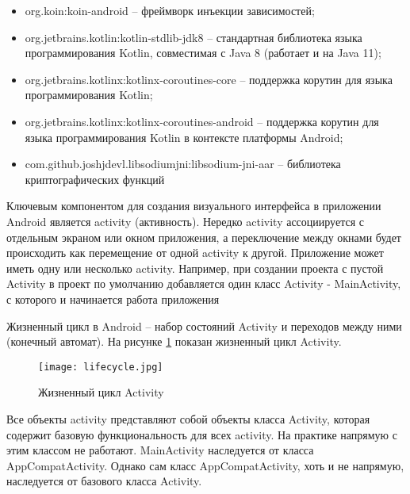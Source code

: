 \begin{itemize}
    \item org.koin:koin-android -- фреймворк инъекции зависимостей;
	\item org.jetbrains.kotlin:kotlin-stdlib-jdk8 -- стандартная библиотека языка программирования Kotlin, совместимая с Java 8 (работает и на Java 11);
    \item org.jetbrains.kotlinx:kotlinx-coroutines-core -- поддержка корутин для языка программирования Kotlin;
    \item org.jetbrains.kotlinx:kotlinx-coroutines-android -- поддержка корутин для языка программирования Kotlin в контексте платформы Android;
    \item com.github.joshjdevl.libsodiumjni:libsodium-jni-aar -- библиотека криптографических функций
\end{itemize}

Ключевым компонентом для создания визуального интерфейса в приложении Android является activity (активность). Нередко activity ассоциируется с отдельным экраном или окном приложения, а переключение между окнами будет происходить как перемещение от одной activity к другой. Приложение может иметь одну или несколько activity. Например, при создании проекта с пустой Activity в проект по умолчанию добавляется один класс Activity - MainActivity, с которого и начинается работа приложения

Жизненный цикл в Android -- набор состояний Activity и переходов между ними (конечный автомат). На рисунке \ref{fig:lifecycle} показан жизненный цикл Activity.

\clearpage

\begin{figure}[ht]
    \centering
    \texttt{[image: lifecycle.jpg]}
	\caption{Жизненный цикл Activity}
	\label{fig:lifecycle}
\end{figure}

Все объекты activity представляют собой объекты класса Activity, которая содержит базовую функциональность для всех activity.
На практике напрямую с этим классом не работают.
MainActivity наследуется от класса AppCompatActivity.
Однако сам класс AppCompatActivity, хоть и не напрямую, наследуется от базового класса Activity.
